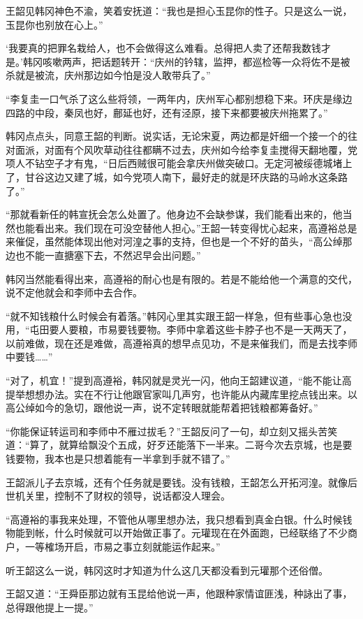 王韶见韩冈神色不渝，笑着安抚道：“我也是担心玉昆你的性子。只是这么一说，玉昆你也别放在心上。”

‘我要真的把罪名栽给人，也不会做得这么难看。总得把人卖了还帮我数钱才是。’韩冈咳嗽两声，把话题转开：“庆州的钤辖，监押，都巡检等一众将佐不是被杀就是被流，庆州那边如今怕是没人敢带兵了。”

“李复圭一口气杀了这么些将领，一两年内，庆州军心都别想稳下来。环庆是缘边四路的中段，秦凤也好，鄜延也好，还有泾原，接下来都要被庆州拖累了。”

韩冈点点头，同意王韶的判断。说实话，无论宋夏，两边都是奸细一个接一个的往对面派，对面有个风吹草动往往都瞒不过去，庆州如今给李复圭搅得天翻地覆，党项人不钻空子才有鬼，“日后西贼很可能会拿庆州做突破口。无定河被绥德城堵上了，甘谷这边又建了城，如今党项人南下，最好走的就是环庆路的马岭水这条路了。”

“那就看新任的韩宣抚会怎么处置了。他身边不会缺参谋，我们能看出来的，他当然也能看出来。我们现在可没空替他人担心。”王韶一转变得忧心起来，高遵裕总是来催促，虽然能体现出他对河湟之事的支持，但也是一个不好的苗头，“高公绰那边也不能一直搪塞下去，不然迟早会出问题。”

韩冈当然能看得出来，高遵裕的耐心也是有限的。若是不能给他一个满意的交代，说不定他就会和李师中去合作。

“就不知钱粮什么时候会有着落。”韩冈心里其实跟王韶一样急，但有些事心急也没用，“屯田要人要粮，市易要钱要物。李师中拿着这些卡脖子也不是一天两天了，以前难做，现在还是难做，高遵裕真的想早点见功，不是来催我们，而是去找李师中要钱……”

“对了，机宜！”提到高遵裕，韩冈就是灵光一闪，他向王韶建议道，“能不能让高提举想想办法。实在不行让他跟官家叫几声穷，也许能从内藏库里挖点钱出来。以高公绰如今的急切，跟他说一声，说不定转眼就能帮着把钱粮都筹备好。”

“你能保证转运司和李师中不雁过拔毛？”王韶反问了一句，却立刻又摇头苦笑道：“算了，就算给飘没个五成，好歹还能落下一半来。二哥今次去京城，也是要钱要物，我本也是只想着能有一半拿到手就不错了。”

王韶派儿子去京城，还有个任务就是要钱。没有钱粮，王韶怎么开拓河湟。就像后世机关里，控制不了财权的领导，说话都没人理会。

“高遵裕的事我来处理，不管他从哪里想办法，我只想看到真金白银。什么时候钱物能到帐，什么时候就可以开始做正事了。元瓘现在在外面跑，已经联络了不少商户，一等榷场开启，市易之事立刻就能运作起来。”

听王韶这么一说，韩冈这时才知道为什么这几天都没看到元瓘那个还俗僧。

王韶又道：“王舜臣那边就有玉昆给他说一声，他跟种家情谊匪浅，种詠出了事，总得跟他提上一提。”

